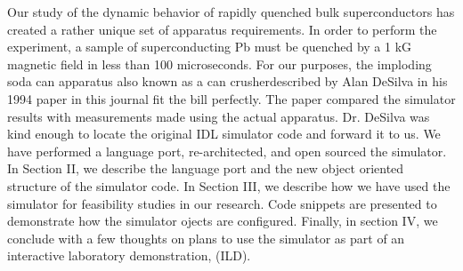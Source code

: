 \documentclass[prb,preprint]{revtex4-1}
\begin{document}
Our study of the dynamic behavior of rapidly quenched bulk superconductors has created a rather unique set of apparatus requirements.  In order to perform the experiment, a sample of superconducting Pb must be quenched by a 1 kG magnetic field in less than 100 microseconds.  For our purposes, the imploding soda can apparatus \textemdash also known as a can crusher\textemdash described by Alan DeSilva in his 1994 paper\cite{desilvacan} in this journal fit the bill perfectly.  The paper compared the simulator results with measurements made using the actual apparatus.  Dr. DeSilva was kind enough to locate the original IDL simulator code and forward it to us.  We have performed a language port, re-architected, and open sourced the simulator.  In Section II, we describe the language port and the new object oriented structure of the simulator code.  In Section III, we describe how we have used the simulator for feasibility studies in our research.  Code  snippets are presented to demonstrate how the simulator ojects are configured.  Finally, in section IV, we conclude with a few thoughts on plans to use the simulator as part of an interactive laboratory demonstration, (ILD).
\\
\\
\end{document}
